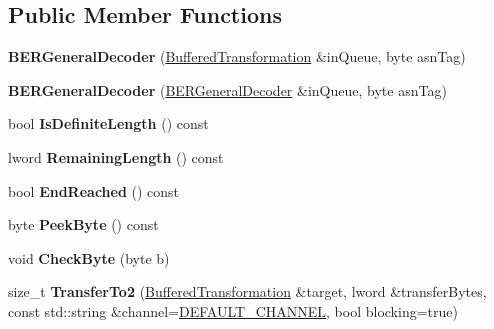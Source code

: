 \subsection*{Public Member Functions}
\begin{DoxyCompactItemize}
\item 
\hypertarget{class_b_e_r_general_decoder_a4044a915e770a703520a2349730ace38}{
{\bfseries BERGeneralDecoder} (\hyperlink{class_buffered_transformation}{BufferedTransformation} \&inQueue, byte asnTag)}
\label{class_b_e_r_general_decoder_a4044a915e770a703520a2349730ace38}

\item 
\hypertarget{class_b_e_r_general_decoder_aa95f58ca2fb775aa5f3f355e6bfb43ee}{
{\bfseries BERGeneralDecoder} (\hyperlink{class_b_e_r_general_decoder}{BERGeneralDecoder} \&inQueue, byte asnTag)}
\label{class_b_e_r_general_decoder_aa95f58ca2fb775aa5f3f355e6bfb43ee}

\item 
\hypertarget{class_b_e_r_general_decoder_a5d5551c010d907d417c9afbde08d4eeb}{
bool {\bfseries IsDefiniteLength} () const }
\label{class_b_e_r_general_decoder_a5d5551c010d907d417c9afbde08d4eeb}

\item 
\hypertarget{class_b_e_r_general_decoder_a844b11daf24a90216b62e65989d5c36f}{
lword {\bfseries RemainingLength} () const }
\label{class_b_e_r_general_decoder_a844b11daf24a90216b62e65989d5c36f}

\item 
\hypertarget{class_b_e_r_general_decoder_a96f80a33071119a37de9f5cd9cd73990}{
bool {\bfseries EndReached} () const }
\label{class_b_e_r_general_decoder_a96f80a33071119a37de9f5cd9cd73990}

\item 
\hypertarget{class_b_e_r_general_decoder_a84a7e1a9313b1086b1cb9084f569c933}{
byte {\bfseries PeekByte} () const }
\label{class_b_e_r_general_decoder_a84a7e1a9313b1086b1cb9084f569c933}

\item 
\hypertarget{class_b_e_r_general_decoder_af420c75709d4e5d8a5a1253ce458d882}{
void {\bfseries CheckByte} (byte b)}
\label{class_b_e_r_general_decoder_af420c75709d4e5d8a5a1253ce458d882}

\item 
\hypertarget{class_b_e_r_general_decoder_a52f64e5904cbdddea92dfcff67d4cc7a}{
size\_\-t {\bfseries TransferTo2} (\hyperlink{class_buffered_transformation}{BufferedTransformation} \&target, lword \&transferBytes, const std::string \&channel=\hyperlink{cryptlib_8h_a6f1917f54ea8c2a45de6e08c5087c8de}{DEFAULT\_\-CHANNEL}, bool blocking=true)}
\label{class_b_e_r_general_decoder_a52f64e5904cbdddea92dfcff67d4cc7a}


\end{DoxyCompactItemize}
